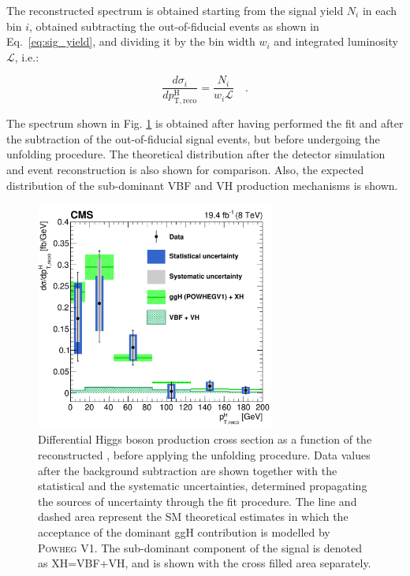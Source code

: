 The reconstructed spectrum is obtained starting from the signal yield $N_i$ in each \pth bin $i$, obtained subtracting the out-of-fiducial events as shown in Eq.~\eqref{eq:sig_yield}, and dividing it by the bin width $w_i$ and integrated luminosity $\mathcal{L}$, i.e.:

\begin{equation}
\frac{d\sigma_i}{d p_\mathrm{T,reco}^\mathrm{H}} = \frac{N_i}{w_i \mathcal{L}} \quad.
\end{equation}

The spectrum shown in Fig. \ref{fig:pre_unfolding} is obtained after having performed the fit and after the subtraction of the out-of-fiducial signal events, but before undergoing the unfolding procedure. The theoretical distribution after the detector simulation and event reconstruction is also shown for comparison. Also, the expected distribution of the sub-dominant VBF and VH production mechanisms is shown.

\begin{figure}[htb]
\centering
\includegraphics[width=0.7\textwidth]{images/unblinding/pth_reco_paper.pdf}
\caption{Differential Higgs boson production cross section as a function of the reconstructed \pth{}, before applying the unfolding procedure. Data values after the background subtraction are shown together with the statistical and the systematic uncertainties, determined propagating the sources of uncertainty through the fit procedure. The line and dashed area represent the SM theoretical estimates in which the acceptance of the dominant ggH contribution is modelled by \textsc{Powheg V1}. The sub-dominant component of the signal is denoted as XH=VBF+VH, and is shown with the cross filled area separately.}\label{fig:pre_unfolding}
\end{figure}

